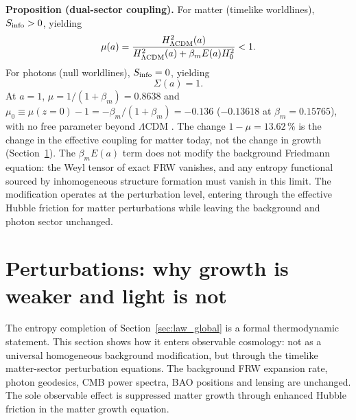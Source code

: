 \textbf{Proposition (dual-sector coupling).} For matter (timelike worldlines), $S_{\rm info}>0$, yielding
\begin{equation}
\mu(a)=\frac{H^2_{\Lambda{\rm CDM}}(a)}{H^2_{\Lambda{\rm CDM}}(a)+\beta_mE(a)H_0^2}<1. \label{eq:mu}
\end{equation}
For photons (null worldlines), $S_{\rm info}=0$, yielding
\begin{equation}
\Sigma(a)=1. \label{eq:law_Sigma}
\end{equation}
At $a=1$, $\mu=1/(1+\beta_m)=0.8638$ and $\mu_0\equiv\mu(z{=}0)-1=-\beta_m/(1+\beta_m)=-0.136$ ($-0.13618$ at $\beta_m=0.15765$), with no free parameter
beyond $\Lambda$CDM \prediction. The change $1-\mu=13.62\,\%$ is the change in the effective coupling for matter today, not the change in growth
(Section~\ref{sec:perturbations}). The $\beta_mE(a)$ term does not modify the background Friedmann equation: the Weyl tensor of exact FRW vanishes, and any
entropy functional sourced by inhomogeneous structure formation must vanish in this limit. The modification operates at the perturbation level, entering
through the effective Hubble friction for matter perturbations while leaving the background and photon sector unchanged.

\section{Perturbations: why growth is weaker and light is not}\label{sec:perturbations}
The entropy completion of Section~\ref{sec:law_global} is a formal thermodynamic statement. This section shows how it enters observable cosmology: not as
a universal homogeneous background modification, but through the timelike matter-sector perturbation equations. The background FRW expansion rate, photon
geodesics, CMB power spectra, BAO positions and lensing are unchanged. The sole observable effect is suppressed matter growth through enhanced Hubble
friction in the matter growth equation.


